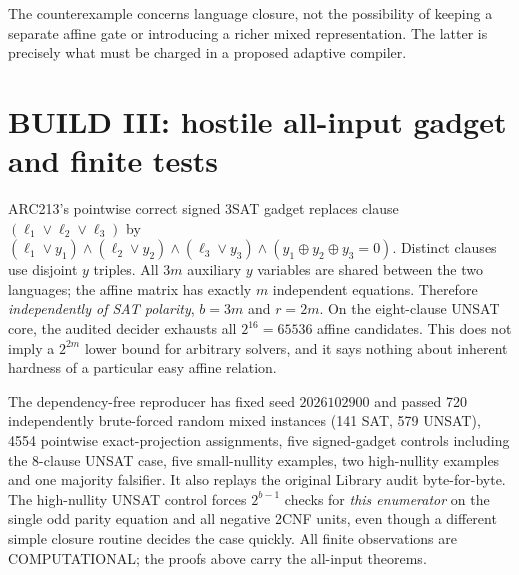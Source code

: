 \documentclass[11pt]{article}
\begin{document}
The counterexample concerns language closure, not the possibility of keeping a separate affine gate or introducing a richer mixed representation. The latter is precisely what must be charged in a proposed adaptive compiler.

\section{BUILD III: hostile all-input gadget and finite tests}
ARC213's pointwise correct signed 3SAT gadget replaces clause $(\ell_1\vee\ell_2\vee\ell_3)$ by $(\ell_1\vee y_1)\wedge(\ell_2\vee y_2)\wedge(\ell_3\vee y_3)\wedge(y_1\oplus y_2\oplus y_3=0)$. Distinct clauses use disjoint $y$ triples. All $3m$ auxiliary $y$ variables are shared between the two languages; the affine matrix has exactly $m$ independent equations. Therefore \emph{independently of SAT polarity}, $b=3m$ and $r=2m$. On the eight-clause UNSAT core, the audited decider exhausts all $2^{16}=65536$ affine candidates. This does not imply a $2^{2m}$ lower bound for arbitrary solvers, and it says nothing about inherent hardness of a particular easy affine relation.

The dependency-free reproducer has fixed seed $2026102900$ and passed 720 independently brute-forced random mixed instances (141 SAT, 579 UNSAT), 4554 pointwise exact-projection assignments, five signed-gadget controls including the 8-clause UNSAT case, five small-nullity examples, two high-nullity examples and one majority falsifier. It also replays the original Library audit byte-for-byte. The high-nullity UNSAT control forces $2^{b-1}$ checks for \emph{this enumerator} on the single odd parity equation and all negative 2CNF units, even though a different simple closure routine decides the case quickly. All finite observations are COMPUTATIONAL; the proofs above carry the all-input theorems.
\end{document}
